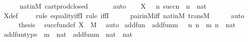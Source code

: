 \begin{isabellebody}
\ \ \ \ \isamarkupfalse%
\ nat{\isacharunderscore}{\kern0pt}in{\isacharunderscore}{\kern0pt}M\ cartprod{\isacharunderscore}{\kern0pt}closed\ \isanewline
\ \ \ \ \isamarkupfalse%
\ auto\isanewline
\ \ \isamarkupfalse%
\ {\isachardoublequoteopen}X\ {\isacharequal}{\kern0pt}\ {\isacharbraceleft}{\kern0pt}\ {\isacharless}{\kern0pt}n{\isacharcomma}{\kern0pt}\ succ{\isacharparenleft}{\kern0pt}n{\isacharparenright}{\kern0pt}{\isachargreater}{\kern0pt}\ {\isachardot}{\kern0pt}\ n\ {\isasymin}\ nat\ {\isacharbraceright}{\kern0pt}{\isachardoublequoteclose}\ \isanewline
\ \ \ \ \isamarkupfalse%
\ X{\isacharunderscore}{\kern0pt}def\isanewline
\ \ \ \ \isamarkupfalse%
{\isacharparenleft}{\kern0pt}rule\ equality{\isacharunderscore}{\kern0pt}iffI{\isacharcomma}{\kern0pt}\ rule\ iffI{\isacharparenright}{\kern0pt}\isanewline
\ \ \ \ \isamarkupfalse%
\ pair{\isacharunderscore}{\kern0pt}in{\isacharunderscore}{\kern0pt}M{\isacharunderscore}{\kern0pt}iff\ nat{\isacharunderscore}{\kern0pt}in{\isacharunderscore}{\kern0pt}M\ transM\isanewline
\ \ \ \ \isamarkupfalse%
\ auto\isanewline
\ \ \isamarkupfalse%
\ \isamarkupfalse%
\ {\isacharquery}{\kern0pt}thesis\ \isamarkupfalse%
\ succ{\isacharunderscore}{\kern0pt}fun{\isacharunderscore}{\kern0pt}def\ {\isacartoucheopen}X\ {\isasymin}\ M{\isacartoucheclose}\ \isamarkupfalse%
\ auto\isanewline
{}\isamarkupfalse%
%
\endisatagproof
{\isafoldproof}%
%
\isadelimproof
\isanewline
%
\endisadelimproof
\isanewline
{}\isamarkupfalse%
\ add{\isacharunderscore}{\kern0pt}fun\ \ {\isachardoublequoteopen}add{\isacharunderscore}{\kern0pt}fun{\isacharparenleft}{\kern0pt}m{\isacharparenright}{\kern0pt}\ {\isasymequiv}\ {\isacharbraceleft}{\kern0pt}\ {\isacharless}{\kern0pt}n{\isacharcomma}{\kern0pt}\ n\ {\isacharhash}{\kern0pt}{\isacharplus}{\kern0pt}\ m{\isachargreater}{\kern0pt}{\isachardot}{\kern0pt}\ n\ {\isasymin}\ nat\ {\isacharbraceright}{\kern0pt}{\isachardoublequoteclose}\ \isanewline
\isanewline
{}\isamarkupfalse%
\ add{\isacharunderscore}{\kern0pt}fun{\isacharunderscore}{\kern0pt}type\ {\isacharcolon}{\kern0pt}\ {\isachardoublequoteopen}m\ {\isasymin}\ nat\ {\isasymLongrightarrow}\ add{\isacharunderscore}{\kern0pt}fun{\isacharparenleft}{\kern0pt}m{\isacharparenright}{\kern0pt}\ {\isasymin}\ nat\ {\isasymrightarrow}\ nat{\isachardoublequoteclose}\ \isanewline
%
\isadelimproof
\ \ %
\endisadelimproof

\end{isabellebody}
